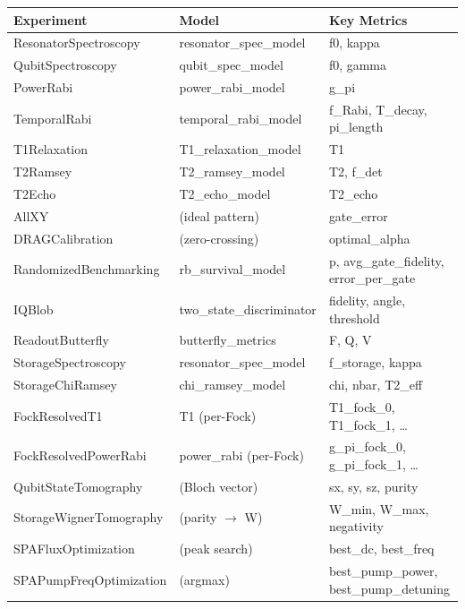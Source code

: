 \documentclass[11pt]{article}
\begin{document}
\begin{longtable}{llp{5cm}}
\toprule
\textbf{Experiment} & \textbf{Model} & \textbf{Key Metrics} \\
\midrule
\endhead
ResonatorSpectroscopy   & resonator\_spec\_model  & f0, kappa \\
QubitSpectroscopy       & qubit\_spec\_model      & f0, gamma \\
PowerRabi               & power\_rabi\_model      & g\_pi \\
TemporalRabi            & temporal\_rabi\_model   & f\_Rabi, T\_decay, pi\_length \\
T1Relaxation            & T1\_relaxation\_model   & T1 \\
T2Ramsey                & T2\_ramsey\_model       & T2, f\_det \\
T2Echo                  & T2\_echo\_model         & T2\_echo \\
AllXY                   & (ideal pattern)         & gate\_error \\
DRAGCalibration         & (zero-crossing)         & optimal\_alpha \\
RandomizedBenchmarking  & rb\_survival\_model     & p, avg\_gate\_fidelity, error\_per\_gate \\
IQBlob                  & two\_state\_discriminator & fidelity, angle, threshold \\
ReadoutButterfly        & butterfly\_metrics      & F, Q, V \\
StorageSpectroscopy     & resonator\_spec\_model  & f\_storage, kappa \\
StorageChiRamsey        & chi\_ramsey\_model      & chi, nbar, T2\_eff \\
FockResolvedT1          & T1 (per-Fock)           & T1\_fock\_0, T1\_fock\_1, \ldots \\
FockResolvedPowerRabi   & power\_rabi (per-Fock)  & g\_pi\_fock\_0, g\_pi\_fock\_1, \ldots \\
QubitStateTomography    & (Bloch vector)          & sx, sy, sz, purity \\
StorageWignerTomography & (parity $\rightarrow$ W)& W\_min, W\_max, negativity \\
SPAFluxOptimization     & (peak search)           & best\_dc, best\_freq \\
SPAPumpFreqOptimization & (argmax)                & best\_pump\_power, best\_pump\_detuning \\
\bottomrule
\end{longtable}
\end{document}

